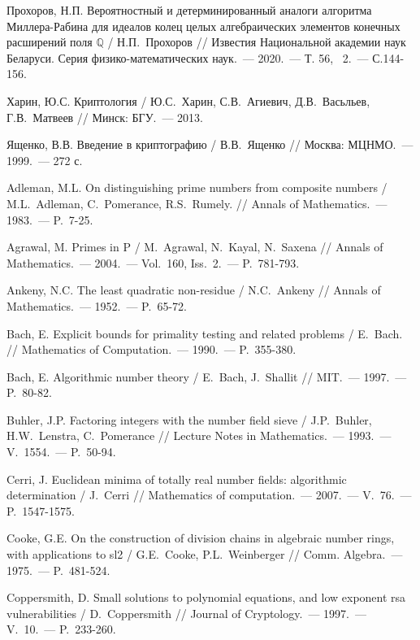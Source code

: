 \begin{thebibliography}{99}
    Прохоров, Н.П. Вероятностный и детерминированный аналоги алгоритма Миллера-Рабина для идеалов колец целых алгебраических элементов конечных расширений поля $\mathbb{Q}$ / Н.П.~Прохоров // Известия Национальной академии наук Беларуси. Серия физико-математических наук.~--- 2020.~--- Т. 56, \textnumero~2.~--- С.144-156.
    
    Харин, Ю.С. Криптология / Ю.С.~Харин, С.В.~Агиевич, Д.В.~Васьльев, Г.В.~Матвеев // Минск: БГУ.~--- 2013.

    Ященко, В.В. Введение в криптографию / В.В.~Ященко // Москва: МЦНМО.~--- 1999.~--- 272 с.

    Adleman, M.L. On distinguishing prime numbers from composite numbers / M.L.~Adleman, C.~Pomerance, R.S.~Rumely. // Annals of Mathematics.~--- 1983.~--- P.~7-25.

    Agrawal, M. Primes in P / M.~Agrawal, N.~Kayal, N.~Saxena // Annals of Mathematics.~--- 2004.~--- Vol.~160, Iss.~2.~--- P.~781-793.

    Ankeny, N.C. The least quadratic non-residue / N.C.~Ankeny // Annals of Mathematics.~--- 1952.~--- P.~65-72.

    Bach, E. Explicit bounds for primality testing and related problems / E.~Bach. // Mathematics of Computation.~--- 1990.~--- P.~355-380.

    Bach, E. Algorithmic number theory / E.~Bach, J.~Shallit // MIT.~--- 1997.~--- P.~80-82.

    Buhler, J.P. Factoring integers with the number field sieve / J.P.~Buhler, H.W.~Lenstra, C.~Pomerance // Lecture Notes in Mathematics.~--- 1993.~--- V.~1554.~--- P.~50-94.

    Cerri, J. Euclidean minima of totally real number fields: algorithmic determination / J.~Cerri // Mathematics of computation.~--- 2007.~--- V.~76.~--- P.~1547-1575.

    Cooke, G.E. On the construction of division chains in algebraic number rings, with applications to sl2 / G.E.~Cooke, P.L.~Weinberger // Comm. Algebra.~--- 1975.~--- P.~481-524.

    Coppersmith, D. Small solutions to polynomial equations, and low exponent rsa vulnerabilities / D.~Coppersmith // Journal of Cryptology.~--- 1997.~--- V.~10.~--- P.~233-260.


\end{thebibliography}

